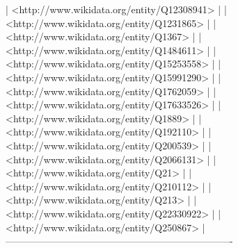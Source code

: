 \documentclass[a4paper, 12pt]{report}
\begin{document}
\begin{messageshell}
| <http://www.wikidata.org/entity/Q12308941>                         |
| <http://www.wikidata.org/entity/Q1231865>                          |
| <http://www.wikidata.org/entity/Q1367>                             |
| <http://www.wikidata.org/entity/Q1484611>                          |
| <http://www.wikidata.org/entity/Q15253558>                         |
| <http://www.wikidata.org/entity/Q15991290>                         |
| <http://www.wikidata.org/entity/Q1762059>                          |
| <http://www.wikidata.org/entity/Q17633526>                         |
| <http://www.wikidata.org/entity/Q1889>                             |
| <http://www.wikidata.org/entity/Q192110>                           |
| <http://www.wikidata.org/entity/Q200539>                           |
| <http://www.wikidata.org/entity/Q2066131>                          |
| <http://www.wikidata.org/entity/Q21>                               |
| <http://www.wikidata.org/entity/Q210112>                           |
| <http://www.wikidata.org/entity/Q213>                              |
| <http://www.wikidata.org/entity/Q22330922>                         |
| <http://www.wikidata.org/entity/Q250867>                           |
----------------------------------------------------------------------
\end{messageshell}
\end{document}
